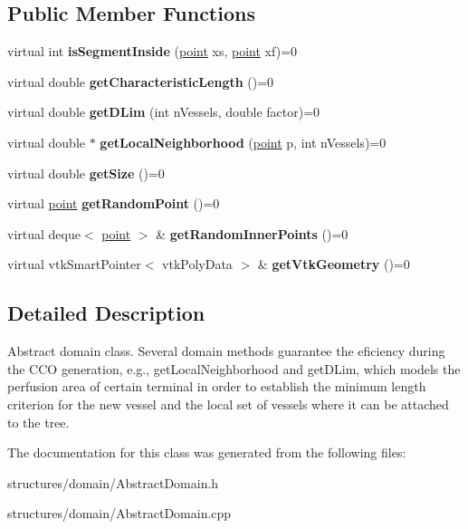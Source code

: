 \subsection*{Public Member Functions}
\begin{DoxyCompactItemize}
\item 
\mbox{\label{class_abstract_domain_a8544eef21fb6700ecc02e9cd50884efd}} 
virtual int {\bfseries is\+Segment\+Inside} (\mbox{\hyperlink{structpoint}{point}} xs, \mbox{\hyperlink{structpoint}{point}} xf)=0
\item 
\mbox{\label{class_abstract_domain_a90ca3dff64bab2428da8ced24e16f4c3}} 
virtual double {\bfseries get\+Characteristic\+Length} ()=0
\item 
\mbox{\label{class_abstract_domain_a9a9fe5588652bd83041b7602ff3efd30}} 
virtual double {\bfseries get\+D\+Lim} (int n\+Vessels, double factor)=0
\item 
\mbox{\label{class_abstract_domain_a5811a6a0af154e95c891a2bd4c8afd19}} 
virtual double $\ast$ {\bfseries get\+Local\+Neighborhood} (\mbox{\hyperlink{structpoint}{point}} p, int n\+Vessels)=0
\item 
\mbox{\label{class_abstract_domain_a049564d82f2c177c39834dfc8da143dc}} 
virtual double {\bfseries get\+Size} ()=0
\item 
\mbox{\label{class_abstract_domain_ae31a5b26d1dc628abe24da7a4d375415}} 
virtual \mbox{\hyperlink{structpoint}{point}} {\bfseries get\+Random\+Point} ()=0
\item 
\mbox{\label{class_abstract_domain_a73d2c0e7c670b007bb5dbbdab5ad6b1b}} 
virtual deque$<$ \mbox{\hyperlink{structpoint}{point}} $>$ \& {\bfseries get\+Random\+Inner\+Points} ()=0
\item 
\mbox{\label{class_abstract_domain_abb1e386d2899cb6b725509259a836cd0}} 
virtual vtk\+Smart\+Pointer$<$ vtk\+Poly\+Data $>$ \& {\bfseries get\+Vtk\+Geometry} ()=0
\end{DoxyCompactItemize}


\subsection{Detailed Description}
Abstract domain class. Several domain methods guarantee the eficiency during the C\+CO generation, e.\+g., get\+Local\+Neighborhood and get\+D\+Lim, which models the perfusion area of certain terminal in order to establish the minimum length criterion for the new vessel and the local set of vessels where it can be attached to the tree. 

The documentation for this class was generated from the following files\+:\begin{DoxyCompactItemize}
\item 
structures/domain/Abstract\+Domain.\+h\item 
structures/domain/Abstract\+Domain.\+cpp\end{DoxyCompactItemize}
